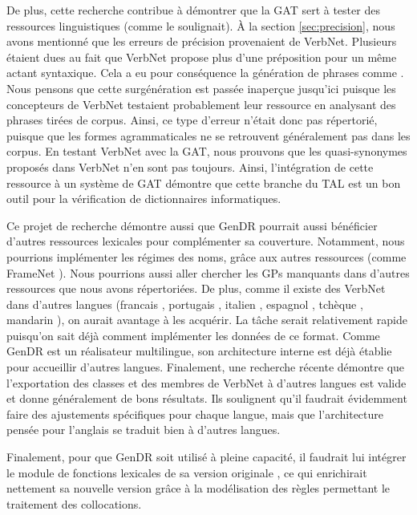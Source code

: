 De plus, cette recherche contribue à démontrer que la \ac{GAT} sert à tester des ressources linguistiques (comme \cite{DanlosPresentationmodelegeneration1983} le soulignait). À la section \ref{sec:precision}, nous avons mentionné que les erreurs de précision provenaient de VerbNet. Plusieurs étaient dues au fait que VerbNet propose plus d'une préposition pour un même actant syntaxique. Cela a eu pour conséquence la génération de phrases comme \ungr{}. Nous pensons que cette surgénération est passée inaperçue jusqu'ici puisque les concepteurs de VerbNet testaient probablement leur ressource en analysant des phrases tirées de corpus. Ainsi, ce type d'erreur n'était donc pas répertorié, puisque que les formes agrammaticales ne se retrouvent généralement pas dans les corpus. En testant VerbNet avec la \ac{GAT}, nous prouvons que les quasi-synonymes proposés dans VerbNet n'en sont pas toujours. Ainsi, l'intégration de cette ressource à un système de \ac{GAT} démontre que cette branche du \ac{TAL} est un bon outil pour la vérification de dictionnaires informatiques.

Ce projet de recherche démontre aussi que GenDR pourrait aussi bénéficier d'autres ressources lexicales pour complémenter sa couverture. Notamment, nous pourrions implémenter les régimes des noms, grâce aux autres ressources (comme FrameNet \cite{FillmoreBackgroundFramenet2003a}). Nous pourrions aussi aller chercher les \acp{GP} manquants dans d'autres ressources que nous avons répertoriées. De plus, comme il existe des VerbNet dans d'autres langues (francais \citep{danlos:hal-01179175}, portugais \citep{ScartoncrosslinguisticVerbNetstylelexicon2012}, italien \citep{busso2016italian}, espagnol \citep{TauleAnCoraNetMappingSpanish2010}, tchèque \citep{pala2008can}, mandarin \citep{liu2008construction}), on aurait avantage à les acquérir. La tâche serait relativement rapide puisqu'on sait déjà comment implémenter les données de ce format. Comme GenDR est un réalisateur multilingue, son architecture interne est déjà établie pour accueillir d'autres langues. Finalement, une recherche récente \citep{Majewska2017} démontre que l'exportation des classes et des membres de VerbNet \citep{SchulerVerbnetBroadcoverageComprehensive2005} à d'autres langues est valide et donne généralement de bons résultats. Ils soulignent qu'il faudrait évidemment faire des ajustements spécifiques pour chaque langue, mais que l'architecture pensée pour l'anglais se traduit bien à d'autres langues. 

Finalement, pour que GenDR soit utilisé à pleine capacité, il faudrait lui intégrer le module de fonctions lexicales de sa version originale \citep{LambreyImplementationcollocationspour2017, lareau18}, ce qui enrichirait nettement sa nouvelle version grâce à la modélisation des règles permettant le traitement des collocations.